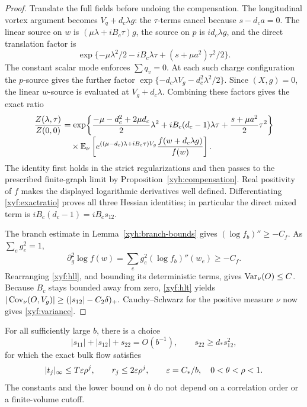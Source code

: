 \begin{proof}
Translate the full fields before undoing the compensation.  The
longitudinal vortex argument becomes \(V_q+d_c\lambda g\): the
\(\tau\)-terms cancel because \(s-d_ca=0\).  The linear source on
\(w\) is \((\mu\lambda+iB_c\tau)g\), the source on \(p\) is
\(id_c\lambda g\), and the direct translation factor is
\[
 \exp\{-\mu\lambda^2/2-iB_c\lambda\tau
                  +(s+\mu a^2)\tau^2/2\}.
\]
The constant scalar mode enforces \(\sum q_v=0\).
At each such charge configuration the \(p\)-source gives the further
factor \(\exp\{-d_c\lambda V_g-d_c^2\lambda^2/2\}\).
Since \((X,g)=0\), the linear \(w\)-source is evaluated at
\(V_g+d_c\lambda\).  Combining these factors gives the exact ratio
\begin{align}
 \frac{Z(\lambda,\tau)}{Z(0,0)}
 &=\exp\!\left\{\frac{-\mu-d_c^2+2\mu d_c}{2}\lambda^2
        +iB_c(d_c-1)\lambda\tau
        +\frac{s+\mu a^2}{2}\tau^2\right\}\notag\\[-2pt]
 &\quad\times\mathbb E_\nu\left[
    e^{((\mu-d_c)\lambda+iB_c\tau)V_g}
    \frac{f(w+d_c\lambda g)}{f(w)}\right].
 \label{xyf:exactratio}
\end{align}
The identity first holds in the strict regularizations and then passes
to the prescribed finite-graph limit by Proposition~\ref{xyh:compensation}.
Real positivity of \(f\) makes the displayed logarithmic derivatives
well defined.  Differentiating \eqref{xyf:exactratio} proves all three
Hessian identities; in particular the direct mixed term is
\(iB_c(d_c-1)=iB_cs_{12}\).

The branch estimate in Lemma~\ref{xyh:branch-bounds} gives
\((\log f_b)''\ge-C_f\).  As \(\sum_e g_e^2=1\),
\[
 \partial_g^2\log f(w)
     =\sum_e g_e^2(\log f_b)''(w_e)\ge-C_f.
\]
Rearranging \eqref{xyf:hll}, and bounding its deterministic terms,
gives \(\operatorname{Var}_\nu(O)\le C\).  Because \(B_c\) stays bounded away
from zero, \eqref{xyf:hlt} yields
\(
 |\operatorname{Cov}_\nu(O,V_g)|\ge(|s_{12}|-C_2\delta)_+.
\)
Cauchy--Schwarz for the positive measure \(\nu\) now gives
\eqref{xyf:variance}.
\end{proof}

\begin{proposition}\label{xyf:shooting}
For all sufficiently large \(b\), there is a choice
\[
 |s_{11}|+|s_{12}|+s_{22}=O(b^{-1}),\qquad
 s_{22}\ge d_*s_{12}^2,
\]
for which the exact bulk flow satisfies
\begin{equation}
 |t_j|_\infty\le T\varepsilon\rho^j,
 \qquad r_j\le2\varepsilon\rho^j,
 \qquad \varepsilon=C_*/b,
 \quad 0<\theta<\rho<1.
 \label{xyf:survivor}
\end{equation}
The constants and the lower bound on \(b\) do not depend on a
correlation order or a finite-volume cutoff.
\end{proposition}

